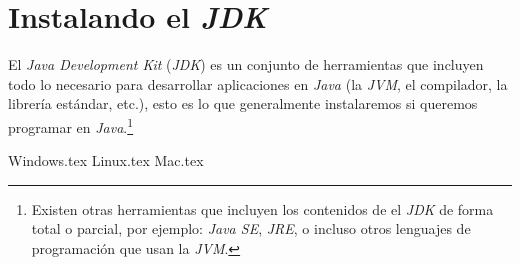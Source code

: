 \section{Instalando el \textit{JDK}}
  El \textit{Java Development Kit} (\textit{JDK}) es un conjunto de herramientas que incluyen 
  todo lo necesario para desarrollar aplicaciones en \textit{Java} (la \textit{JVM}, el 
  compilador, la librería estándar, etc.), esto es lo que generalmente instalaremos si queremos
  programar en \textit{Java}.\footnote{Existen otras herramientas que incluyen los contenidos de 
  el \textit{JDK} de forma total o parcial, por ejemplo: \textit{Java SE}, \textit{JRE}, o 
  incluso otros lenguajes de programación que usan la \textit{JVM}.}

  {Windows.tex}
  {Linux.tex}
  {Mac.tex}